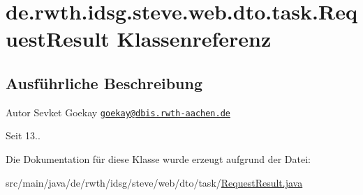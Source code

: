 \hypertarget{classde_1_1rwth_1_1idsg_1_1steve_1_1web_1_1dto_1_1task_1_1_request_result}{\section{de.\+rwth.\+idsg.\+steve.\+web.\+dto.\+task.\+Request\+Result Klassenreferenz}
\label{classde_1_1rwth_1_1idsg_1_1steve_1_1web_1_1dto_1_1task_1_1_request_result}
}


\subsection{Ausführliche Beschreibung}
\begin{DoxyAuthor}{Autor}
Sevket Goekay \href{mailto:goekay@dbis.rwth-aachen.de}{\tt goekay@dbis.\+rwth-\/aachen.\+de} 
\end{DoxyAuthor}
\begin{DoxySince}{Seit}
13.. 
\end{DoxySince}


Die Dokumentation für diese Klasse wurde erzeugt aufgrund der Datei\+:\begin{DoxyCompactItemize}
\item 
src/main/java/de/rwth/idsg/steve/web/dto/task/\hyperlink{_request_result_8java}{Request\+Result.\+java}\end{DoxyCompactItemize}
